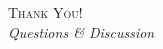 \documentclass[xcolor=x11names,compress,9pt]{beamer}
\renewcommand{\(}{\begin{columns}}
\renewcommand{\)}{\end{columns}}
\newcommand{\<}[1]{\begin{column}{#1}}
\renewcommand{\>}{\end{column}}
\begin{document}
\begin{frame}
    \centering
    \Huge \textsc{Thank You!} \\ \vspace{0.6cm}
    \large \textit{Questions \& Discussion}
\end{frame}
\end{document}
